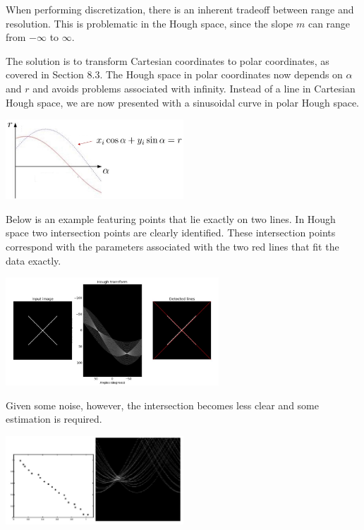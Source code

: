 \documentclass[twoside]{article}
\begin{document}
When performing discretization, there is an inherent tradeoff between range and resolution. This is problematic in the Hough space, since the slope $m$ can range from $-\infty$ to $\infty$.

The solution is to transform Cartesian coordinates to polar coordinates, as covered in Section 8.3. The Hough space in polar coordinates now depends on $\alpha$ and $r$ and avoids problems associated with infinity. Instead of a line in Cartesian Hough space, we are now presented with a sinusoidal curve in polar Hough space.

\begin{center}
	\includegraphics[width=0.5\textwidth]{hough4}
\end{center}

Below is an example featuring points that lie exactly on two lines. In Hough space two intersection points are clearly identified. These intersection points correspond with the parameters associated with the two red lines that fit the data exactly.

\begin{center}
	\includegraphics[width=0.6\textwidth]{hough5}
\end{center}

Given some noise, however, the intersection becomes less clear and some estimation is required.

\begin{center}
	\includegraphics[width=0.5\textwidth]{hough6}
\end{center}
\end{document}
